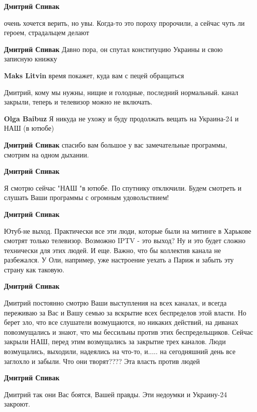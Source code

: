 \begin{itemize}
\begin{itemize}
\textbf{Дмитрий Спивак} 

очень хочется верить, но увы. Когда-то это пороху пророчили, а сейчас чуть ли
героем, страдальцем делают


\textbf{Дмитрий Спивак} Давно пора, он спутал конституцию Украины и свою записную книжку

\textbf{Maks Litvin} время покажет, куда вам с пецей обращаться
\end{itemize} %


Дмитрий, кому мы нужны, нищие и голодные, последний нормальный. канал
закрыли, теперь и телевизор можно не включать.

\begin{itemize} %
\textbf{Olga Baibuz} Я никуда не ухожу и буду продолжать вещать на Украина-24 и НАШ (в ютюбе)

\textbf{Дмитрий Спивак} спасибо вам большое у вас замечательные программы, смотрим на одном дыхании.

\textbf{Дмитрий Спивак} 

Я смотрю сейчас "НАШ "в ютюбе. По спутнику отключили. Будем смотреть и слушать
Ваши программы с огромным удовольствием!


\textbf{Дмитрий Спивак} 

Ютуб-не выход. Практически все эти люди, которые были на митинге в Харькове
смотрят только телевизор. Возможно IPTV - это выход? Ну и это будет сложно
технически для этих людей. И еще. Важно, что бы коллектив канала не разбежался.
У Оли, например, уже настроение уехать а Париж и забыть эту страну как таковую.

\textbf{Дмитрий Спивак} 

Дмитрий постоянно смотрю Ваши выступления на всех каналах, и всегда переживаю
за Вас и Вашу семью за вскрытие всех беспределов этой власти. Но берет зло, что
все слушатели возмущаются, но никаких действий, на диванах повозмущались и
знают, что мы бессильны против этих беспредельщиков. Сейчас закрыли НАШ, перед
этим возмущались за закрытие трех каналов. Люди возмущались, выходили,
надеялись на что-то, и..... на сегодняшний день все заглохло и забыли. Что они
творят???? Эта власть против людей

\textbf{Дмитрий Спивак} 

Дмитрий так они Вас боятся, Вашей правды. Эти недоумки и Украину-24 закроют.


\end{itemize}
\end{itemize}
